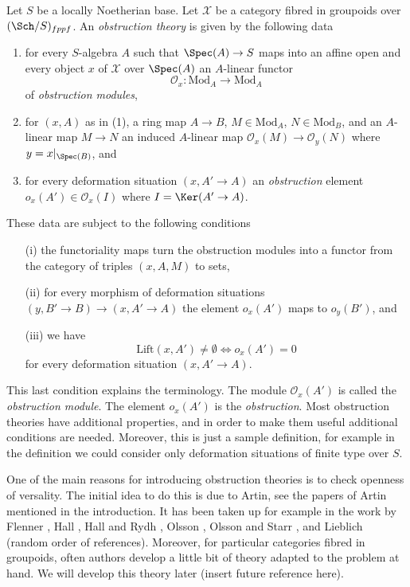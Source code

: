 \begin{definition}
\label{definition-obstruction-theory}
Let $S$ be a locally Noetherian base. Let $\mathcal{X}$ be a category fibred
in groupoids over $(\Sch/S)_{fppf}$. An {\it obstruction theory} is 
given by the following data
\begin{enumerate}
\item for every $S$-algebra $A$ such that $\Spec(A) \to S$
maps into an affine open and every object $x$ of $\mathcal{X}$ over
$\Spec(A)$ an $A$-linear functor
$$
\mathcal{O}_x : \text{Mod}_A \to \text{Mod}_A
$$
of {\it obstruction modules},
\item for $(x, A)$ as in (1), a ring map $A \to B$,
$M \in \text{Mod}_A$, $N \in \text{Mod}_B$, and an $A$-linear
map $M \to N$ an induced $A$-linear map $\mathcal{O}_x(M) \to \mathcal{O}_y(N)$
where $y = x|_{\Spec(B)}$, and
\item for every deformation situation $(x, A' \to A)$ an
{\it obstruction} element
$o_x(A') \in \mathcal{O}_x(I)$ where $I = \Ker(A' \to A)$.
\end{enumerate}
These data are subject to the following conditions
\begin{enumerate}
\item[(i)] the functoriality maps turn the obstruction modules into a functor
from the category of triples $(x, A, M)$ to sets,
\item[(ii)] for every morphism of deformation situations
$(y, B' \to B) \to (x, A' \to A)$ the element $o_x(A')$ maps
to $o_y(B')$, and
\item[(iii)] we have
$$
\text{Lift}(x, A') \not = \emptyset
\Leftrightarrow
o_x(A') = 0
$$
for every deformation situation $(x, A' \to A)$.
\end{enumerate}
\end{definition}

\noindent
This last condition explains the terminology. The module $\mathcal{O}_x(A')$
is called the {\it obstruction module}. The element $o_x(A')$ is the
{\it obstruction}.
Most obstruction theories have additional properties, and in order to
make them useful additional conditions are needed.
Moreover, this is just a sample definition, for example in the definition
we could consider only deformation situations of finite type over $S$.

\medskip\noindent
One of the main reasons for introducing obstruction theories is to check
openness of versality. The initial idea to do this is due to Artin, see
the papers of Artin mentioned in the introduction. It has been taken up
for example in the work by Flenner \cite{Flenner},
Hall \cite{Hall-coherent},
Hall and Rydh \cite{rydh_axioms},
Olsson \cite{olsson_deformation},
Olsson and Starr \cite{olsson-starr}, and
Lieblich \cite{lieblich-complexes} (random order of references).
Moreover, for particular categories fibred in groupoids, often
authors develop a little bit of theory adapted to the problem at hand.
We will develop this theory later (insert future reference here).

